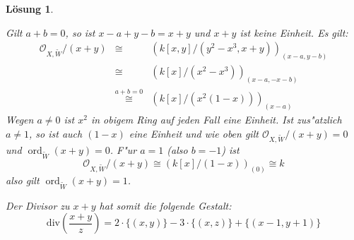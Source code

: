 \documentclass[paper = A4, fontsize=12pt, numbers=noendperiod, chapterprefix=true]{scrbook}
\theoremstyle{break}
\newtheorem{Loes}{L\"osung}
\theoremstyle{nonumberbreak}
\theoremstyle{nonumberplain}
\DeclareMathOperator{\ord}{ord}
\newcommand{\calO}{\mathcal{O}}
\begin{document}
\begin{Loes}
\begin{enumerate}[a)]
  Gilt $a+b = 0$, so ist $x-a + y-b = x+y$ und $x+y$ ist keine Einheit. Es gilt:
  $$\begin{array}{rcl}
	\calO_{X,\widetilde{W}} / (x+y) &\cong& \left(k[x,y]/(y^2-x^3,x+y)\right)_{(x-a,y-b)}\\
  &\cong& \left(k[x]/(x^2-x^3)\right)_{(x-a,-x-b)}\\
  &\stackrel{a+b = 0}{\cong}& \left(k[x]/(x^2(1-x))\right)_{(x-a)}
	\end{array}
  $$
  Wegen $a\neq 0$ ist $x^2$ in obigem Ring auf jeden Fall eine Einheit. Ist zus"atzlich $a\neq 1$, so ist auch $(1-x)$ eine Einheit und wie oben gilt $\calO_{X,\widetilde{W}}/(x+y) = 0$ und $\ord_{\widetilde{W}} (x+y) = 0$.
  F"ur $a=1$ (also $b=-1$) ist 
  $$
  \calO_{X,\widetilde{W}} / (x+y) \cong \left(k[x]/(1-x)\right)_{(0)} \cong k
  $$
  also gilt $\ord_{\widetilde{W}} (x+y) = 1$.

  Der Divisor zu $x+y$ hat somit die folgende Gestalt:
  $$\textrm{div}\left(\frac{x+y}{z}\right) = 2 \cdot \{(x,y)\} - 3 \cdot \{(x,z)\} +  \{(x-1,y+1)\}$$
\end{enumerate}\end{Loes}
\end{document}
